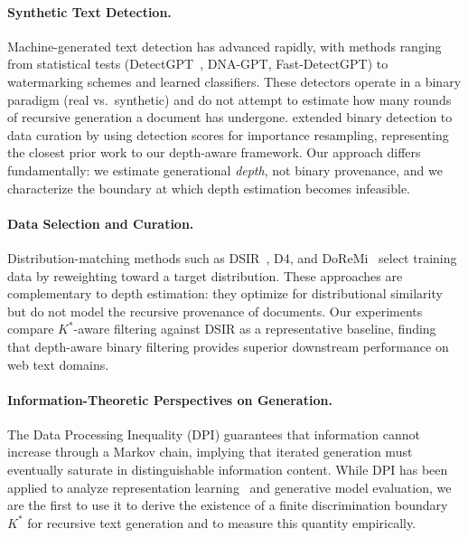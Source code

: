 \documentclass[11pt,a4paper]{article}
\begin{document}
\paragraph{Synthetic Text Detection.}
Machine-generated text detection has advanced rapidly, with methods ranging from statistical tests (DetectGPT~\citep{mitchell2023detectgpt}, DNA-GPT, Fast-DetectGPT) to watermarking schemes and learned classifiers. These detectors operate in a binary paradigm (real vs.\ synthetic) and do not attempt to estimate how many rounds of recursive generation a document has undergone. \citet{drayson2025detecting} extended binary detection to data curation by using detection scores for importance resampling, representing the closest prior work to our depth-aware framework. Our approach differs fundamentally: we estimate generational \emph{depth}, not binary provenance, and we characterize the boundary at which depth estimation becomes infeasible.

\paragraph{Data Selection and Curation.}
Distribution-matching methods such as DSIR~\citep{xie2023data}, D4, and DoReMi~\citep{xia2024less} select training data by reweighting toward a target distribution. These approaches are complementary to depth estimation: they optimize for distributional similarity but do not model the recursive provenance of documents. Our experiments compare $K^*$-aware filtering against DSIR as a representative baseline, finding that depth-aware binary filtering provides superior downstream performance on web text domains.

\paragraph{Information-Theoretic Perspectives on Generation.}
The Data Processing Inequality (DPI) guarantees that information cannot increase through a Markov chain, implying that iterated generation must eventually saturate in distinguishable information content. While DPI has been applied to analyze representation learning~\citep{shwartz2017opening} and generative model evaluation, we are the first to use it to derive the existence of a finite discrimination boundary $K^*$ for recursive text generation and to measure this quantity empirically.


\end{document}
